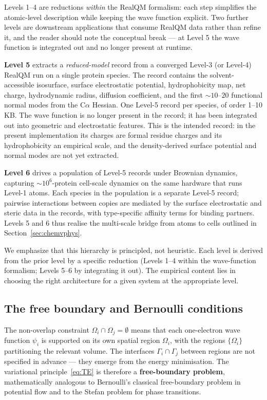 \documentclass[11pt]{article}
\begin{document}
Levels 1--4 are reductions \emph{within} the RealQM formalism: each step simplifies the atomic-level description while keeping the wave function explicit. Two further levels are downstream applications that consume RealQM data rather than refine it, and the reader should note the conceptual break --- at Level 5 the wave function is integrated out and no longer present at runtime.

\textbf{Level 5} extracts a \emph{reduced-model} record from a converged Level-3 (or Level-4) RealQM run on a single protein species. The record contains the solvent-accessible isosurface, surface electrostatic potential, hydrophobicity map, net charge, hydrodynamic radius, diffusion coefficient, and the first $\sim 10$--$20$ functional normal modes from the C$\alpha$ Hessian. One Level-5 record per species, of order 1--10 KB. The wave function is no longer present in the record; it has been integrated out into geometric and electrostatic features. This is the intended record: in the present implementation its charges are formal residue charges and its hydrophobicity an empirical scale, and the density-derived surface potential and normal modes are not yet extracted.

\textbf{Level 6} drives a population of Level-5 records under Brownian dynamics, capturing $\sim 10^6$-protein cell-scale dynamics on the same hardware that runs Level-1 atoms. Each species in the population is a separate Level-5 record; pairwise interactions between copies are mediated by the surface electrostatic and steric data in the records, with type-specific affinity terms for binding partners. Levels 5 and 6 thus realise the multi-scale bridge from atoms to cells outlined in Section~\ref{sec:chemvphys}.

We emphasize that this hierarchy is principled, not heuristic. Each level is derived from the prior level by a specific reduction (Levels 1--4 within the wave-function formalism; Levels 5--6 by integrating it out). The empirical content lies in choosing the right architecture for a given system at the appropriate level.

\subsection{The free boundary and Bernoulli conditions}\label{sec:bernoulli}

The non-overlap constraint $\Omega_i \cap \Omega_j = \emptyset$ means that each one-electron wave function $\psi_i$ is supported on its own spatial region $\Omega_i$, with the regions $\{\Omega_i\}$ partitioning the relevant volume. The interfaces $\Gamma_i \cap \Gamma_j$ between regions are not specified in advance --- they emerge from the energy minimisation. The variational principle~\eqref{eq:TE} is therefore a \textbf{free-boundary problem}, mathematically analogous to Bernoulli's classical free-boundary problem in potential flow and to the Stefan problem for phase transitions.
\end{document}

